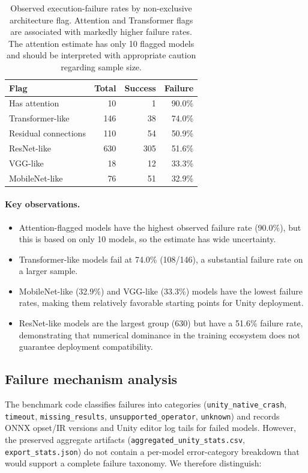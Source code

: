 \documentclass[10pt,twocolumn,letterpaper]{article}
\begin{document}
\begin{table}[t]
\centering\small
\begin{tabular}{lrrr}
\toprule
Flag & Total & Success & Failure \\
\midrule
Has attention & 10 & 1 & 90.0\% \\
Transformer-like & 146 & 38 & 74.0\% \\
Residual connections & 110 & 54 & 50.9\% \\
ResNet-like & 630 & 305 & 51.6\% \\
VGG-like & 18 & 12 & 33.3\% \\
MobileNet-like & 76 & 51 & 32.9\% \\
\bottomrule
\end{tabular}
\caption{Observed execution-failure rates by non-exclusive architecture flag. Attention and Transformer flags are associated with markedly higher failure rates. The attention estimate has only 10 flagged models and should be interpreted with appropriate caution regarding sample size.}
\label{tab:families}
\end{table}

\paragraph{Key observations.}
\begin{itemize}[nosep,leftmargin=*]
  \item Attention-flagged models have the highest observed failure rate (90.0\%), but this is based on only 10 models, so the estimate has wide uncertainty.
  \item Transformer-like models fail at 74.0\% (108/146), a substantial failure rate on a larger sample.
  \item MobileNet-like (32.9\%) and VGG-like (33.3\%) models have the lowest failure rates, making them relatively favorable starting points for Unity deployment.
  \item ResNet-like models are the largest group (630) but have a 51.6\% failure rate, demonstrating that numerical dominance in the training ecosystem does not guarantee deployment compatibility.
\end{itemize}

\subsection{Failure mechanism analysis}

The benchmark code classifies failures into categories (\texttt{unity\_native\_crash}, \texttt{timeout}, \texttt{missing\_results}, \texttt{unsupported\_operator}, \texttt{unknown}) and records ONNX opset/IR versions and Unity editor log tails for failed models. However, the preserved aggregate artifacts (\texttt{aggregated\_unity\_stats.csv}, \texttt{export\_stats.json}) do not contain a per-model error-category breakdown that would support a complete failure taxonomy. We therefore distinguish:
\end{document}
